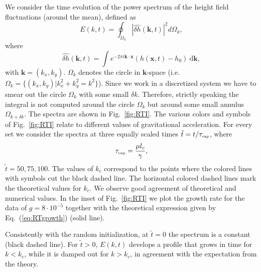 We consider the time evolution of the power spectrum of the height field fluctuations (around the mean), defined as 
\begin{equation}\label{eq:powerspec}
    E(k,t) = \oint_{\Omega_k} |\hat{\delta h}(\mathbf{k},t)|^2 d\Omega_k,
\end{equation}
where
\begin{equation}\label{eq:spectra}
    \hat{\delta h}(\mathbf{k},t) = \int e^{-2\pi i\mathbf{k}\cdot\mathbf{x}} (h(\mathbf{x},t)-h_0)~\mathrm{d}\mathbf{k},
\end{equation}
with $\mathbf{k}=(k_x,k_y)$. $\Omega_k$ denotes the circle in $\mathbf{k}$-space (i.e. $\Omega_k = \{(k_x, k_y) | k_x^2 + k_y^2 = k^2 \}$). 
Since we work in a discretized system we have to smear out the circle $\Omega_k$ with some small $\delta k$. 
Therefore, strictly speaking the integral is not computed around the circle $\Omega_k$ but around some small annulus $\Omega_{k + \delta k}$.
The spectra are shown in Fig.~\ref{fig:RTI}. The various colors and symbols of Fig.~\ref{fig:RTI} relate to different values of gravitational acceleration. For every set we consider the spectra at three equally scaled times $\tilde{t}=t/\tau_{\mbox{\tiny{cap}}}$, where
\begin{equation}
    \tau_{\mbox{\tiny{cap}}} = \frac{\mu l_c}{\gamma},
\end{equation}
$\tilde{t}=50, 75, 100$. 
The values of $k_c$ correspond to the points where the colored lines with symbols cut the black dashed line. 
The horizontal colored dashed lines mark the theoretical values for $k_c$. 
We observe good agreement of theoretical and numerical values. 
In the inset of Fig.~\ref{fig:RTI} we plot the growth rate for the data of $g = 8\cdot 10^{-5}$ together with the theoretical expression given by Eq.~(\ref{eq:RTgrowth}) (solid line).

Consistently with the random initialization, at $\tilde{t}=0$ the spectrum is a constant (black dashed line). 
For $\tilde{t}>0$, $E(k,t)$ develops a profile that grows in time for $k<k_c$, while it is damped out for $k>k_c$, in agreement with the expectation from the theory.


